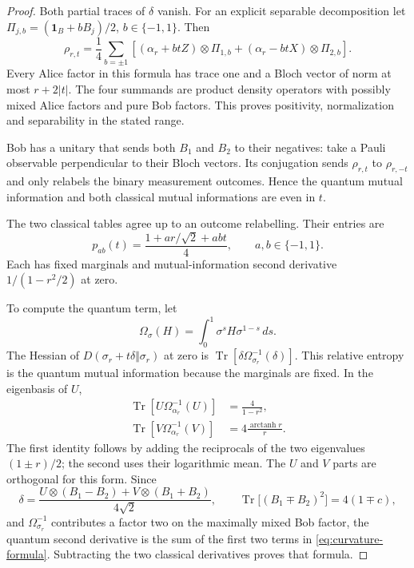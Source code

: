 \begin{proof}
 Both partial traces of $\delta$ vanish.  For an explicit separable
 decomposition let $\Pi_{j,b}=(\mathbf1_B+bB_j)/2$, $b\in\{-1,1\}$.
 Then
 \begin{equation}
  \rho_{r,t}=\frac14\sum_{b=\pm1}
  \left[(\alpha_r+btZ)\otimes\Pi_{1,b}
       +(\alpha_r-btX)\otimes\Pi_{2,b}\right].
  \label{eq:four-product-decomposition}
 \end{equation}
 Every Alice factor in this formula has trace one and a Bloch vector
 of norm at most $r+2|t|$.  The four summands are product density
 operators with possibly mixed Alice factors and pure Bob factors.
 This proves positivity, normalization and separability in the stated range.

 Bob has a unitary that sends both $B_1$ and $B_2$ to their negatives:
 take a Pauli observable perpendicular to their Bloch vectors.  Its
 conjugation sends $\rho_{r,t}$ to $\rho_{r,-t}$ and only relabels the
 binary measurement outcomes.  Hence the quantum mutual information
 and both classical mutual informations are even in $t$.

 The two classical tables agree up to an outcome relabelling.  Their
 entries are
 \begin{equation}
  p_{ab}(t)=\frac{1+a r/\sqrt2+abt}{4},
  \qquad a,b\in\{-1,1\}.
  \label{eq:binary-tables}
 \end{equation}
 Each has fixed marginals and mutual-information second derivative
 $1/(1-r^2/2)$ at zero.

 To compute the quantum term, let
 \[
  \Omega_\sigma(H)=\int_0^1\sigma^s H\sigma^{1-s}\,ds.
 \]
 The Hessian of $D(\sigma_r+t\delta\Vert\sigma_r)$ at zero is
 $\operatorname{Tr}[\delta\Omega_{\sigma_r}^{-1}(\delta)]$.
 This relative entropy is the quantum mutual information because the
 marginals are fixed.  In the eigenbasis of $U$,
 \begin{equation}
 \begin{split}
  \operatorname{Tr}[U\Omega_{\alpha_r}^{-1}(U)]
    &=\frac4{1-r^2},\\
  \operatorname{Tr}[V\Omega_{\alpha_r}^{-1}(V)]
    &=4\frac{\operatorname{arctanh}r}{r}.
 \end{split}
 \label{eq:alice-logmean}
 \end{equation}
 The first identity follows by adding the reciprocals of the two
 eigenvalues $(1\pm r)/2$; the second uses their logarithmic mean.
 The $U$ and $V$ parts are orthogonal for this form.  Since
 \[
  \delta=\frac{U\otimes(B_1-B_2)+V\otimes(B_1+B_2)}{4\sqrt2},
  \qquad
  \operatorname{Tr}\bigl[(B_1\mp B_2)^2\bigr]=4(1\mp c),
 \]
 and $\Omega_{\sigma_r}^{-1}$ contributes a factor two on the
 maximally mixed Bob factor, the quantum second derivative is the
 sum of the first two terms in \eqref{eq:curvature-formula}.
 Subtracting the two classical derivatives proves that formula.


\end{proof}
